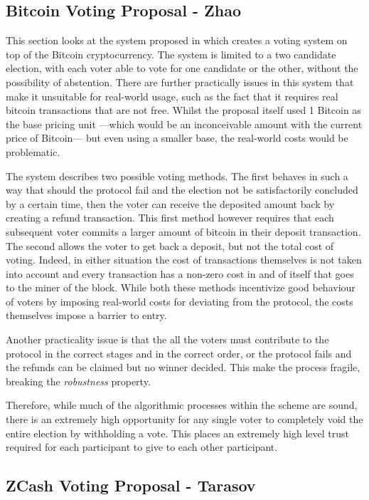 \subsection{Bitcoin Voting Proposal - Zhao}

This section looks at the system proposed in \cite{zhaoHowVotePrivately2016} which creates a voting system on top of the Bitcoin cryptocurrency. The system is limited to a two candidate election, with each voter able to vote for one candidate or the other, without the possibility of abstention. There are further practically issues in this system that make it unsuitable for real-world usage, such as the fact that it requires real bitcoin transactions that are not free. Whilst the proposal itself used 1 Bitcoin as the base pricing unit ---which would be an inconceivable amount with the current price of Bitcoin--- but even using a smaller base, the real-world costs would be problematic.

The system describes two possible voting methods. The first behaves in such a way that should the protocol fail and the election not be satisfactorily concluded by a certain time, then the voter can receive the deposited amount back by creating a refund transaction. This first method however requires that each subsequent voter commits a larger amount of bitcoin in their deposit transaction. The second allows the voter to get back a deposit, but not the total cost of voting. Indeed, in either situation the cost of transactions themselves is not taken into account and every transaction has a non-zero cost in and of itself that goes to the miner of the block. While both these methods incentivize good behaviour of voters by imposing real-world costs for deviating from the protocol, the costs themselves impose a barrier to entry.

Another practicality issue is that the all the voters must contribute to the protocol in the correct stages and in the correct order, or the protocol fails and the refunds can be claimed but no winner decided. This make the process fragile, breaking the \emph{robustness} property.

Therefore, while much of the algorithmic processes within the scheme are sound, there is an extremely high opportunity for any single voter to completely void the entire election by withholding a vote. This places an extremely high level trust required for each participant to give to each other participant.

\subsection{ZCash Voting Proposal - Tarasov}

